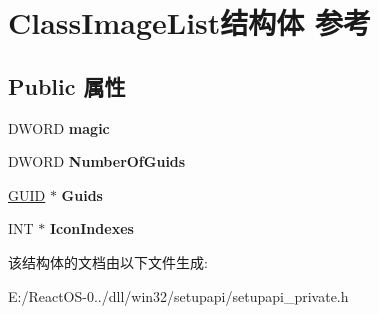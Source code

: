 \hypertarget{struct_class_image_list}{}\section{Class\+Image\+List结构体 参考}
\label{struct_class_image_list}
\subsection*{Public 属性}
\begin{DoxyCompactItemize}
\item 
\mbox{\label{struct_class_image_list_a0cf3168fa94be24a877724ca389b96e3}} 
D\+W\+O\+RD {\bfseries magic}
\item 
\mbox{\label{struct_class_image_list_a9c020024d5c898b16d31fb18f3a7685f}} 
D\+W\+O\+RD {\bfseries Number\+Of\+Guids}
\item 
\mbox{\label{struct_class_image_list_ac6e8786f7b33965061104f8be369cff3}} 
\hyperlink{interface_g_u_i_d}{G\+U\+ID} $\ast$ {\bfseries Guids}
\item 
\mbox{\label{struct_class_image_list_ac753ff7d2a3e4a1dcb771f18c6e42521}} 
I\+NT $\ast$ {\bfseries Icon\+Indexes}
\end{DoxyCompactItemize}


该结构体的文档由以下文件生成\+:\begin{DoxyCompactItemize}
\item 
E\+:/\+React\+O\+S-\/0../dll/win32/setupapi/setupapi\+\_\+private.\+h\end{DoxyCompactItemize}
